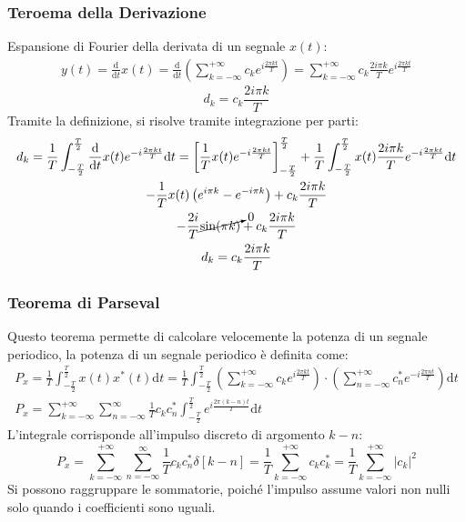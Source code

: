 \documentclass{article}
\newcommand{\df}{\mathrm{d}}
\numberwithin{equation}{subsection}
\begin{document}
\subsubsection{Teroema della Derivazione}

Espansione di Fourier della derivata di un segnale $x(t)$:
\begin{gather*}
    y(t)=\displaystyle\frac{\df}{\df t}x(t)=\frac{\df}{\df t}\left(\displaystyle\sum_{k=-\infty}^{+\infty}c_ke^{i\frac{2\pi kt}{T}}\right)=\sum_{k=-\infty}^{+\infty}c_k\frac{2i\pi k}{T}e^{i\frac{2\pi kt}{T}}
\end{gather*}
\begin{equation}
    d_k=c_k\displaystyle\frac{2i\pi k}{T}
\end{equation}
Tramite la definizione, si risolve tramite integrazione per parti:
\begin{gather*}
    d_k=\displaystyle\frac{1}{T}\int_{-\frac{T}{2}}^{\frac{T}{2}}\frac{\df}{\df t}x(t)e^{-i\frac{2\pi kt}{T}}\df t=
    \left[\frac{1}{T}x(t)e^{-i\frac{2\pi kt}{T}}\right]_{-\frac{T}{2}}^{\frac{T}{2}}+\frac{1}{T}\int_{-\frac{T}{2}}^{\frac{T}{2}}x(t)\frac{2i\pi k}{T}e^{-i\frac{2\pi kt}{T}}\df t\\
    \displaystyle-\frac{1}{T}x(t)\left(e^{i\pi k}-e^{-i\pi k}\right)+c_k\frac{2i\pi k}{T}\\
    \displaystyle-\frac{2i}{T}\cancelto{0}{\sin(\pi k)}+c_k\frac{2i\pi k}{T}\\
    d_k=c_k\displaystyle\frac{2i\pi k}{T}
\end{gather*}

\subsubsection{Teorema di Parseval}

Questo teorema permette di calcolare velocemente la potenza di un segnale periodico, la potenza di un segnale periodico è definita come:
\begin{gather*}
    P_x=\displaystyle\frac{1}{T}\int_{-\frac{T}{2}}^{\frac{T}{2}}x(t)x^*(t)\df t=
    \frac{1}{T}\int_{-\frac{T}{2}}^{\frac{T}{2}}\left(\sum_{k=-\infty}^{+\infty}c_ke^{i\frac{2\pi kt}{T}}\right)\cdot\left(
    \sum_{n=-\infty}^{+\infty}c_n^*e^{-i\frac{2\pi nt}{T}}\right)\df t\\
    P_x=\displaystyle\sum_{k=-\infty}^{+\infty}\sum_{n=-\infty}^{\infty}\frac{1}{T}c_kc^*_n\int_{-\frac{T}{2}}^{\frac{T}{2}}e^{i\frac{2\pi (k-n)t}{T}}\df t
\end{gather*}
L'integrale corrisponde all'impulso discreto di argomento $k-n$:
\begin{equation}
    P_x=\displaystyle\sum_{k=-\infty}^{+\infty}\sum_{n=-\infty}^{\infty}\frac{1}{T}c_kc_n^*\delta[k-n]=\frac{1}{T}\sum_{k=-\infty}^{+\infty}c_kc_k^*=\frac{1}{T}\sum_{k=-\infty}^{+\infty}|c_k|^2
\end{equation}
Si possono raggruppare le sommatorie, poiché l'impulso assume valori non nulli solo quando i coefficienti sono uguali. 
\end{document}

